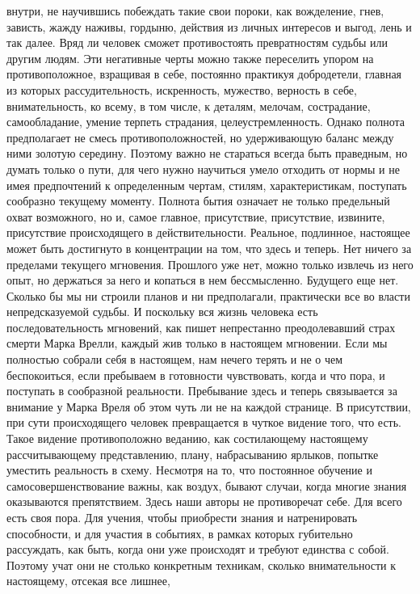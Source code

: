 внутри, не научившись побеждать такие свои пороки, как вожделение, гнев,
зависть, жажду наживы, гордыню, действия из личных интересов и выгод, лень и так
далее. Вряд ли человек сможет противостоять превратностям судьбы или другим
людям. Эти негативные черты можно также переселить упором на противоположное,
взращивая в себе, постоянно практикуя добродетели, главная из которых
рассудительность, искренность, мужество, верность в себе, внимательность, ко
всему, в том числе, к деталям, мелочам, сострадание, самообладание, умение
терпеть страдания, целеустремленность. Однако полнота предполагает не смесь
противоположностей, но удерживающую баланс между ними золотую середину. Поэтому
важно не стараться всегда быть праведным, но думать только о пути, для чего
нужно научиться умело отходить от нормы и не имея предпочтений к определенным
чертам, стилям, характеристикам, поступать сообразно текущему моменту. Полнота
бытия означает не только предельный охват возможного, но и, самое главное,
присутствие, присутствие, извините, присутствие происходящего в
действительности. Реальное, подлинное, настоящее может быть достигнуто в
концентрации на том, что здесь и теперь. Нет ничего за пределами текущего
мгновения. Прошлого уже нет, можно только извлечь из него опыт, но держаться за
него и копаться в нем бессмысленно. Будущего еще нет. Сколько бы мы ни строили
планов и ни предполагали, практически все во власти непредсказуемой судьбы. И
поскольку вся жизнь человека есть последовательность мгновений, как пишет
непрестанно преодолевавший страх смерти Марка Врелли, каждый жив только в
настоящем мгновении. Если мы полностью собрали себя в настоящем, нам нечего
терять и не о чем беспокоиться, если пребываем в готовности чувствовать, когда и
что пора, и поступать в сообразной реальности. Пребывание здесь и теперь
связывается за внимание у Марка Вреля об этом чуть ли не на каждой странице. В
присутствии, при сути происходящего человек превращается в чуткое видение того,
что есть. Такое видение противоположно веданию, как состилающему настоящему
рассчитывающему представлению, плану, набрасыванию ярлыков, попытке уместить
реальность в схему. Несмотря на то, что постоянное обучение и
самосовершенствование важны, как воздух, бывают случаи, когда многие знания
оказываются препятствием. Здесь наши авторы не противоречат себе. Для всего есть
своя пора. Для учения, чтобы приобрести знания и натренировать способности, и
для участия в событиях, в рамках которых губительно рассуждать, как быть, когда
они уже происходят и требуют единства с собой. Поэтому учат они не столько
конкретным техникам, сколько внимательности к настоящему, отсекая все лишнее,
